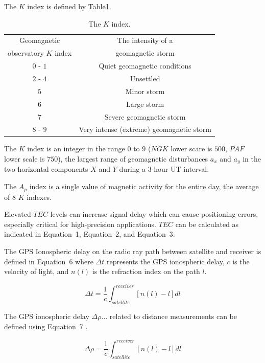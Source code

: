 \documentclass[sn-mathphys-num]{sn-jnl}%
\begin{document}
The $K$ index is defined by Table\ref{tab:K}.

\begin{table}[!ht]
    \centering
    \caption{The $K$ index.}
    \label{tab:K}
    \begin{tabular}{|c|c|}
        \hline
        Geomagnetic & The intensity of a \\ 
        observatory $K$ index & geomagnetic storm \\ \hline
        $0$ - $1$ & Quiet geomagnetic conditions \\ \hline
        $2$ - $4$ & Unsettled \\ \hline
        $5$ & Minor storm \\ \hline
        $6$ & Large storm \\ \hline
        $7$ & Severe geomagnetic storm \\ \hline
        $8$ - $9$ & Very intense (extreme) geomagnetic storm \\ \hline
    \end{tabular}
\end{table}

The $K$ index is an integer in the range $0$ to $9$ ($NGK$ lower scare is $500$, $PAF$ lower scale is $750$), the largest range of geomagnetic disturbances $a_x$ and $a_y$ in the two horizontal components $X$ and $Y$ during a $3$-hour UT interval.

The $A_p$ index is a single value of magnetic activity for the entire day, the average of $8$ $K$ indexes. 
 
Elevated $TEC$ levels can increase signal delay which can cause positioning errors, especially critical for high-precision applications. $TEC$ can be calculated as indicated in Equation~1, Equation~2, and Equation~3. 

The GPS Ionospheric delay on the radio ray path between satellite and receiver is defined in Equation~6 \cite{spilker1996global} where $\Delta t$ represents the GPS ionospheric delay, $c$ is the velocity of light, and $n(l)$ is the refraction index on the path $l$.

\begin{equation}
	\Delta t = \frac{1}{c} \int_{satellite}^{receiver} \left[ n(l) - l \right]dl
	\label{eqn:6}
\end{equation}

The GPS ionospheric delay $\Delta \rho \dots$ related to distance measurements can be defined using Equation~7 \cite{spilker1996global}.

\begin{equation}
	\Delta \rho = \frac{1}{c} \int_{satellite}^{receiver} \left[ n(l) - l \right]dl
	\label{eqn:7}
\end{equation}
\end{document}
